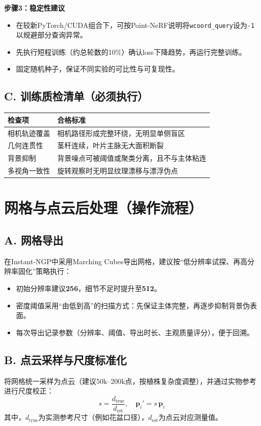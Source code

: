 \documentclass[12pt,a4paper,fontset=fandol]{ctexart}
\begin{document}
\textbf{步骤3：稳定性建议}
\begin{itemize}
  \item 在较新PyTorch/CUDA组合下，可按Point-NeRF说明将\texttt{wcoord\_query}设为\texttt{-1}以规避部分查询异常。
  \item 先执行短程训练（约总轮数的10\%）确认loss下降趋势，再运行完整训练。
  \item 固定随机种子，保证不同实验的可比性与可复现性。
\end{itemize}

\subsection{C. 训练质检清单（必须执行）}
\begin{longtable}{p{}p{}}
\toprule
检查项 & 合格标准 \\
\midrule
相机轨迹覆盖 & 相机路径形成完整环绕，无明显单侧盲区 \\
几何连贯性 & 茎秆连续，叶片主脉无大面积断裂 \\
背景抑制 & 背景噪点可被阈值或聚类分离，且不与主体粘连 \\
多视角一致性 & 旋转观察时无明显纹理漂移与漂浮伪点 \\
\bottomrule
\end{longtable}

\section{网格与点云后处理（操作流程）}
\subsection{A. 网格导出}
在Instant-NGP中采用Marching Cubes导出网格，建议按“低分辨率试探、再高分辨率固化”策略执行：
\begin{itemize}
  \item 初始分辨率建议\textbf{256}，细节不足时提升至\textbf{512}。
  \item 密度阈值采用“由低到高”的扫描方式：先保证主体完整，再逐步抑制背景伪表面。
  \item 每次导出记录参数（分辨率、阈值、导出时长、主观质量评分），便于回溯。
\end{itemize}

\subsection{B. 点云采样与尺度标准化}
将网格统一采样为点云（建议50k--200k点，按植株复杂度调整），并通过实物参考进行尺度校正：
\[
s = \frac{d_{\mathrm{true}}}{d_{\mathrm{est}}}, \quad \mathbf{p}_i' = s\,\mathbf{p}_i
\]
其中，$d_{\mathrm{true}}$为实测参考尺寸（例如花盆口径），$d_{\mathrm{est}}$为点云对应测量值。
\end{document}

